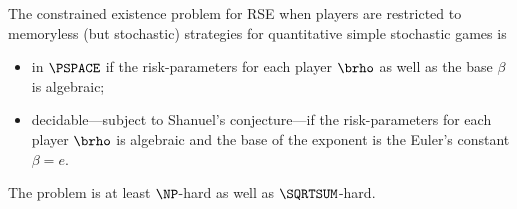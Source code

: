 \begin{lemma}\label{lemma:memorylessRSE}
        The constrained existence problem for RSE when players are restricted to memoryless (but stochastic) strategies for quantitative simple stochastic games is \begin{itemize}
            \item in $\PSPACE$ if the risk-parameters for each player $\brho$ as well as the base $\beta$ is algebraic; 
            \item decidable---subject to Shanuel's conjecture---if the risk-parameters for each player $\brho$  is algebraic and the base of the exponent is the Euler's constant $\beta=e$.
            \end{itemize}
        The problem is at least $\NP$-hard as well as $\SQRTSUM$-hard.
\end{lemma}
